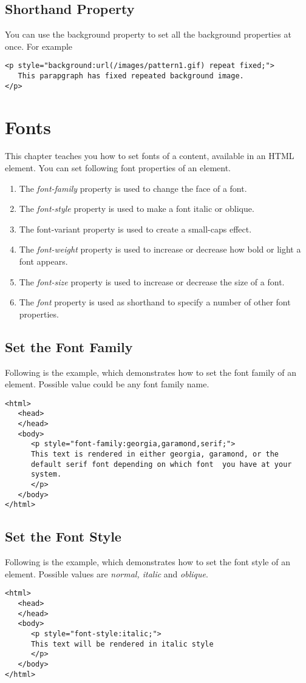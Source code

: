 \documentclass[a4paper,oneside]{book}
\numberwithin{equation}{chapter}
\begin{document}
\subsection{Shorthand Property}
You can use the background property to set all the background properties at once. For example
\begin{verbatim}
<p style="background:url(/images/pattern1.gif) repeat fixed;">
   This parapgraph has fixed repeated background image.
</p>
\end{verbatim}
\section{Fonts}
This chapter teaches you how to set fonts of a content, available in an HTML element. You can set following font properties of an element.
\begin{enumerate}
\item The \textit{font-family} property is used to change the face of a font.
\item The \textit{font-style} property is used to make a font italic or oblique.
\item The font-variant property is used to create a small-caps effect.
\item The \textit{font-weight} property is used to increase or decrease how bold or light a font appears.
\item The \textit{font-size} property is used to increase or decrease the size of a font.
\item The \textit{font} property is used as shorthand to specify a number of other font properties.
\end{enumerate}
\subsection{Set the Font Family}
Following is the example, which demonstrates how to set the font family of an element. Possible value could be any font family name.
\begin{verbatim}
<html>
   <head>
   </head>
   <body>
      <p style="font-family:georgia,garamond,serif;">
      This text is rendered in either georgia, garamond, or the
      default serif font depending on which font  you have at your 
      system.
      </p>
   </body>
</html>
\end{verbatim}
\subsection{Set the Font Style}
Following is the example, which demonstrates how to set the font style of an element. Possible values are \textit{normal, italic} and \textit{oblique}.
\begin{verbatim}
<html>
   <head>
   </head>
   <body>
      <p style="font-style:italic;">
      This text will be rendered in italic style
      </p>
   </body>
</html>
\end{verbatim}
\end{document}
